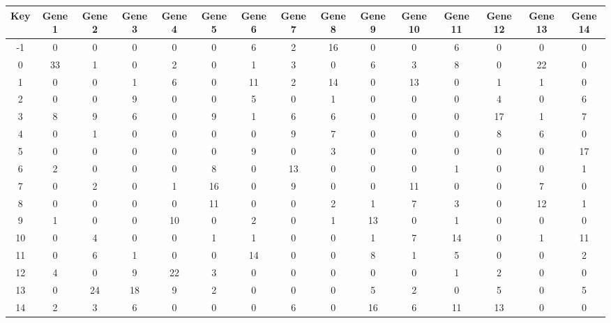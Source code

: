 \begin{tabular}{|c|c|c|c|c|c|c|c|c|c|c|c|c|c|c|}
\hline
Key & Gene 1 & Gene 2 & Gene 3 & Gene 4 & Gene 5 & Gene 6 & Gene 7 & Gene 8 & Gene 9 & Gene 10 & Gene 11 & Gene 12 & Gene 13 & Gene 14 \\
\hline
-1 & 0 & 0 & 0 & 0 & 0 & 6 & 2 & 16 & 0 & 0 & 6 & 0 & 0 & 0 \\
0 & 33 & 1 & 0 & 2 & 0 & 1 & 3 & 0 & 6 & 3 & 8 & 0 & 22 & 0 \\
1 & 0 & 0 & 1 & 6 & 0 & 11 & 2 & 14 & 0 & 13 & 0 & 1 & 1 & 0 \\
2 & 0 & 0 & 9 & 0 & 0 & 5 & 0 & 1 & 0 & 0 & 0 & 4 & 0 & 6 \\
3 & 8 & 9 & 6 & 0 & 9 & 1 & 6 & 6 & 0 & 0 & 0 & 17 & 1 & 7 \\
4 & 0 & 1 & 0 & 0 & 0 & 0 & 9 & 7 & 0 & 0 & 0 & 8 & 6 & 0 \\
5 & 0 & 0 & 0 & 0 & 0 & 9 & 0 & 3 & 0 & 0 & 0 & 0 & 0 & 17 \\
6 & 2 & 0 & 0 & 0 & 8 & 0 & 13 & 0 & 0 & 0 & 1 & 0 & 0 & 1 \\
7 & 0 & 2 & 0 & 1 & 16 & 0 & 9 & 0 & 0 & 11 & 0 & 0 & 7 & 0 \\
8 & 0 & 0 & 0 & 0 & 11 & 0 & 0 & 2 & 1 & 7 & 3 & 0 & 12 & 1 \\
9 & 1 & 0 & 0 & 10 & 0 & 2 & 0 & 1 & 13 & 0 & 1 & 0 & 0 & 0 \\
10 & 0 & 4 & 0 & 0 & 1 & 1 & 0 & 0 & 1 & 7 & 14 & 0 & 1 & 11 \\
11 & 0 & 6 & 1 & 0 & 0 & 14 & 0 & 0 & 8 & 1 & 5 & 0 & 0 & 2 \\
12 & 4 & 0 & 9 & 22 & 3 & 0 & 0 & 0 & 0 & 0 & 1 & 2 & 0 & 0 \\
13 & 0 & 24 & 18 & 9 & 2 & 0 & 0 & 0 & 5 & 2 & 0 & 5 & 0 & 5 \\
14 & 2 & 3 & 6 & 0 & 0 & 0 & 6 & 0 & 16 & 6 & 11 & 13 & 0 & 0 \\
\hline
\end{tabular}